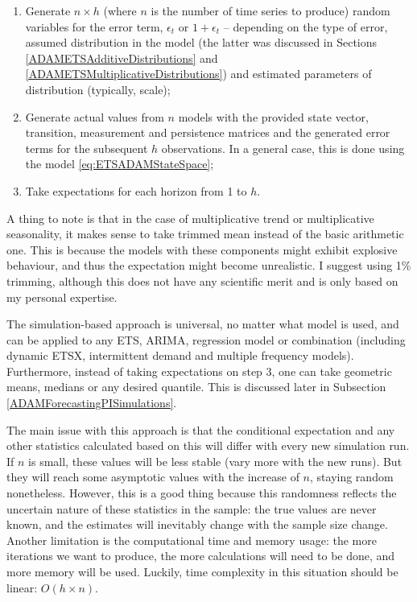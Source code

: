 \documentclass[
]{book}
\providecommand{\tightlist}{%
  \setlength{\itemsep}{0pt}\setlength{\parskip}{0pt}}
\theoremstyle{definition}
\theoremstyle{definition}
\theoremstyle{definition}
\theoremstyle{definition}
\theoremstyle{remark}
\begin{document}
\begin{enumerate}
\def\labelenumi{\arabic{enumi}.}
\tightlist
\item
  Generate \(n \times h\) (where \(n\) is the number of time series to produce) random variables for the error term, \(\epsilon_t\) or \(1+\epsilon_t\) -- depending on the type of error, assumed distribution in the model (the latter was discussed in Sections \ref{ADAMETSAdditiveDistributions} and \ref{ADAMETSMultiplicativeDistributions}) and estimated parameters of distribution (typically, scale);
\item
  Generate actual values from \(n\) models with the provided state vector, transition, measurement and persistence matrices and the generated error terms for the subsequent \(h\) observations. In a general case, this is done using the model \eqref{eq:ETSADAMStateSpace};
\item
  Take expectations for each horizon from 1 to \(h\).
\end{enumerate}

A thing to note is that in the case of multiplicative trend or multiplicative seasonality, it makes sense to take trimmed mean instead of the basic arithmetic one. This is because the models with these components might exhibit explosive behaviour, and thus the expectation might become unrealistic. I suggest using 1\% trimming, although this does not have any scientific merit and is only based on my personal expertise.

The simulation-based approach is universal, no matter what model is used, and can be applied to any ETS, ARIMA, regression model or combination (including dynamic ETSX, intermittent demand and multiple frequency models). Furthermore, instead of taking expectations on step 3, one can take geometric means, medians or any desired quantile. This is discussed later in Subsection \ref{ADAMForecastingPISimulations}.

The main issue with this approach is that the conditional expectation and any other statistics calculated based on this will differ with every new simulation run. If \(n\) is small, these values will be less stable (vary more with the new runs). But they will reach some asymptotic values with the increase of \(n\), staying random nonetheless. However, this is a good thing because this randomness reflects the uncertain nature of these statistics in the sample: the true values are never known, and the estimates will inevitably change with the sample size change. Another limitation is the computational time and memory usage: the more iterations we want to produce, the more calculations will need to be done, and more memory will be used. Luckily, time complexity in this situation should be linear: \(O(h \times n)\).
\end{document}
